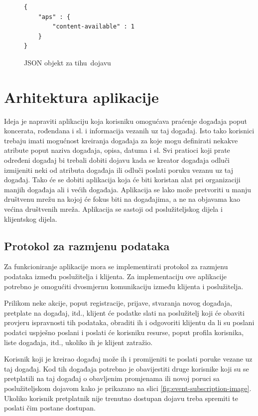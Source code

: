 \documentclass[times, utf8, zavrsni]{fer}
\begin{document}
\begin{figure}
\begin{lstlisting}
{
    "aps" : {
        "content-available" : 1
    }
}
\end{lstlisting}
\caption{JSON objekt za \glqq tihu\grqq\  dojavu}
\label{lst:tiha-dojava}
\end{figure}

\chapter{Arhitektura aplikacije}

Ideja je napraviti aplikaciju koja korisniku omogućava praćenje događaja poput koncerata, rođendana i sl. i informacija vezanih uz taj događaj. Isto tako korisnici trebaju imati mogućnost kreiranja događaja za koje mogu definirati nekakve atribute poput naziva događaja, opisa, datuma i sl. Svi pratioci koji prate određeni događaj bi trebali dobiti dojavu kada se kreator događaja odluči izmijeniti neki od atributa događaja ili odluči poslati poruku vezanu uz taj događaj. Tako će se dobiti aplikacija koja će biti koristan alat pri organizaciji manjih događaja ali i većih događaja. Aplikacija se lako može pretvoriti u manju društvenu mrežu na kojoj će fokus biti na događajima, a ne na objavama kao većina društvenih mreža. Aplikacija se sastoji od poslužiteljskog dijela i klijentskog dijela.

\section{Protokol za razmjenu podataka}
Za funkcioniranje aplikacije mora se implementirati protokol za razmjenu podataka između poslužitelja i klijenta. Za implementaciju ove aplikacije potrebno je omogućiti dvosmjernu komunikaciju između klijenta i poslužitelja.

Prilikom neke akcije, poput registracije, prijave, stvaranja novog događaja, pretplate na događaj, itd., klijent će podatke slati na poslužitelj koji će obaviti provjeru ispravnosti tih podataka, obraditi ih i odgovoriti klijentu da li su poslani podatci uspješno poslani i poslati će korisniku resurse, poput profila korisnika, liste događaja, itd., ukoliko ih je klijent zatražio.

Korisnik koji je kreirao događaj može ih i promijeniti te poslati poruke vezane uz taj događaj. Kod tih događaja potrebno je obavijestiti druge korisnike koji su se pretplatili na taj događaj o obavljenim promjenama ili novoj poruci sa poslužiteljskom dojavom kako je prikazano na slici \ref{fig:event-subscription-image}. Ukoliko korisnik pretplatnik nije trenutno dostupan dojavu treba spremiti te poslati čim postane dostupan.
\end{document}
